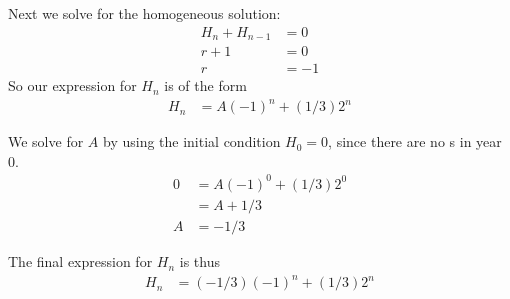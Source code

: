 \documentclass[12pt,oneside]{article}
\newcommand{\hint}[1]{({\it Hint: #1})}
\begin{document}
\begin{problem}{25}
{Next we solve for the homogeneous solution:
%
\begin{align*}
 H_n + H_{n-1} &= 0 \\
 r + 1 &= 0 \\
 r &= -1 
\end{align*}
%
So our expression for $H_n$ is of the form
%
\begin{align*}
 H_n &= A(-1)^n + (1/3)2^n 
\end{align*}

We solve for $A$ by using the initial condition $H_0=0$, since there are no \bbb s in year 0.
%
\begin{align*}
 0 &= A(-1)^0 + (1/3)2^0 \\
 &= A + 1/3 \\
 A &= -1/3
\end{align*}

The final expression for $H_n$ is thus
\begin{align*}
 H_n &= (-1/3)(-1)^n + (1/3)2^n
\end{align*}




}







\eparts






\end{problem}
\end{document}
